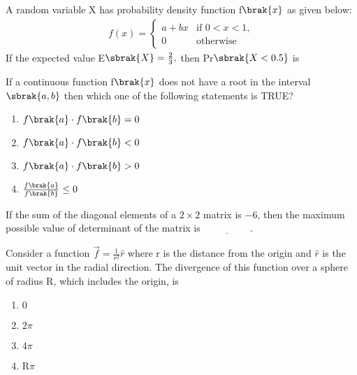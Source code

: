 \iffalse
\chapter{2015}
\author{AI24BTECH11032}
\section{ee}
\fi
    \item  A random variable X has probability density function f$\brak{x}$ as given below:
\begin{align*}
    f(x) = 
    \begin{cases} 
      a + b x & \text{if } 0 < x < 1, \\
      0 & \text{otherwise}
   \end{cases}
\end{align*}
If the expected value E$\sbrak{X}=\frac{2}{3},$ then Pr$\sbrak{X<0.5}$ is
\bigskip
\item If a continuous function f$\brak{x}$ does not have a root in the interval $\sbrak{a,b}$ then which one of the following statements is TRUE?
\begin{enumerate}
    \item $f\brak{a}\cdot f\brak{b}=0$
    \item $f\brak{a}\cdot f\brak{b}<0$
    \item $f\brak{a}\cdot f\brak{b}>0$
    \item $\frac{f\brak{a}} {f\brak{b}}\leq0$
\end{enumerate}
\bigskip
\item If the sum of the diagonal elements of a $2\times2$ matrix is $-6$, then the maximum possible value of determinant of the matrix is $\underline{\hspace{2cm}}.$
\bigskip
\item Consider a function $\overrightarrow{f}=\frac{1}{r^{2}}\hat{r}$ where r is the distance from the origin and $\hat{r}$ is the unit vector in the radial direction. The divergence of this function over a sphere of radius R, which includes the origin, is
\begin{multicols}{4}
    \begin{enumerate}
        \item $0$
        \item $2\pi$
        \item $4\pi$
        \item R$\pi$
    \end{enumerate}
\end{multicols}
